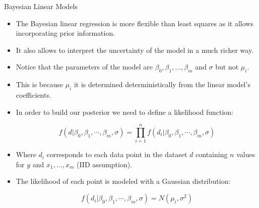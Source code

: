 \documentclass[handout]{beamer}
\begin{document}
\begin{frame}{Bayesian Linear Models}
\scriptsize{
\begin{itemize}


\item The Bayesian linear regression is  more flexible than least squares as it allows incorporating prior information.

\item It also allows to interpret the uncertainty of the model in a much richer way.

\item Notice that the parameters of the model are $\beta_0,\beta_1,\dots,\beta_m$ and $\sigma$ but not $\mu_i$.

\item This is because $\mu_i$ it is determined deterministically from the linear model's coefficients.

\item In order to build our posterior we need to define a likelihood function:

\begin{displaymath}
 f(d|\beta_0,\beta_1,\cdots,\beta_m,\sigma) =\prod_{i=1}^n f(d_i|\beta_0,\beta_1,\cdots,\beta_m,\sigma) 
\end{displaymath}


\item Where $d_i$ corresponds to each data point in the dataset $d$ containing $n$ values for $y$ and $x_1,\dots,x_m$ (IID assumption).

\item The likelihood of each point is modeled with a Gaussian distribution:

\begin{displaymath}
 f(d_i|\beta_0,\beta_1,\cdots,\beta_m,\sigma)= N(\mu_i, \sigma^2)
\end{displaymath}



 
\end{itemize}



} 

\end{frame}
\end{document}
